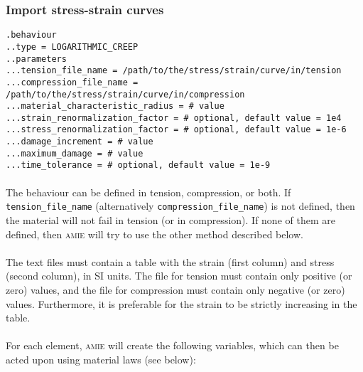 \documentclass[10pt]{article}
\begin{document}
\subsubsection{Import stress-strain curves}

\noindent \verb+.behaviour+\\
\verb+..type = LOGARITHMIC_CREEP+\\
\verb+..parameters+\\
\verb+...tension_file_name = /path/to/the/stress/strain/curve/in/tension+\\
\verb+...compression_file_name = /path/to/the/stress/strain/curve/in/compression+\\
\verb+...material_characteristic_radius = # value+\\
\verb+...strain_renormalization_factor = # optional, default value = 1e4+\\
\verb+...stress_renormalization_factor = # optional, default value = 1e-6+\\
\verb+...damage_increment = # value+\\
\verb+...maximum_damage = # value+\\
\verb+...time_tolerance = # optional, default value = 1e-9+

\paragraph{} The behaviour can be defined in tension, compression, or both. If \verb+tension_file_name+ (alternatively \verb+compression_file_name+) is not defined, then the material will not fail in tension (or in compression). If none of them are defined, then \textsc{amie} will try to use the other method described below.

\paragraph{} The text files must contain a table with the strain (first column) and stress (second column), in SI units. The file for tension must contain only positive (or zero) values, and the file for compression must contain only negative (or zero) values. Furthermore, it is preferable for the strain to be strictly increasing in the table.

\paragraph{}For each element, \textsc{amie} will create the following variables, which can then be acted upon using material laws (see below):\\
\end{document}
